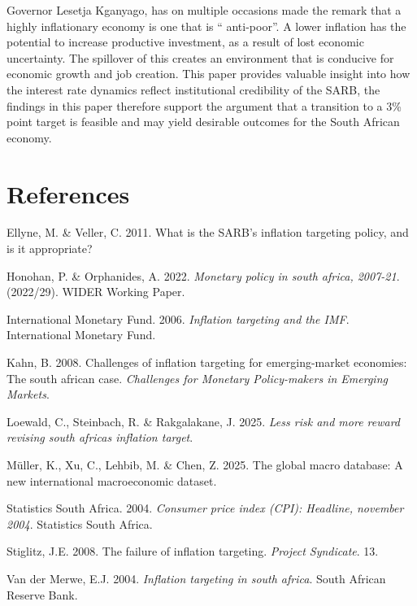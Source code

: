 \documentclass[11pt,preprint]{elsarticle}
\numberwithin{equation}{section}
\numberwithin{figure}{section}
\numberwithin{table}{section}
\newlength{\cslhangindent}
\newenvironment{CSLReferences}[2] %
{\begin{list}{}{%
	\setlength{\itemindent}{0pt}
	\setlength{\leftmargin}{0pt}
	\setlength{\parsep}{0pt}
	\ifodd #1
	\setlength{\leftmargin}{\cslhangindent}
	\setlength{\itemindent}{-1\cslhangindent}
	\fi
	\setlength{\itemsep}{#2\baselineskip}}}
{\end{list}}
\begin{document}
\newpage

Governor Lesetja Kganyago, has on multiple occasions made the remark
that a highly inflationary economy is one that is `` anti-poor''. A
lower inflation has the potential to increase productive investment, as
a result of lost economic uncertainty. The spillover of this creates an
environment that is conducive for economic growth and job creation. This
paper provides valuable insight into how the interest rate dynamics
reflect institutional credibility of the SARB, the findings in this
paper therefore support the argument that a transition to a 3\% point
target is feasible and may yield desirable outcomes for the South
African economy.

\newpage

\section*{References}\label{references}

\label{refs}
\begin{CSLReferences}{1}{1}
Ellyne, M. \& Veller, C. 2011. What is the SARB's inflation targeting
policy, and is it appropriate?

Honohan, P. \& Orphanides, A. 2022. \emph{Monetary policy in south
africa, 2007-21}. (2022/29). WIDER Working Paper.

International Monetary Fund. 2006. \emph{Inflation targeting and the
{IMF}}. International Monetary Fund.

Kahn, B. 2008. Challenges of inflation targeting for emerging-market
economies: The south african case. \emph{Challenges for Monetary
Policy-makers in Emerging Markets}.

Loewald, C., Steinbach, R. \& Rakgalakane, J. 2025. \emph{Less risk and
more reward revising south africas inflation target}.

Müller, K., Xu, C., Lehbib, M. \& Chen, Z. 2025. The global macro
database: A new international macroeconomic dataset.

Statistics South Africa. 2004. \emph{Consumer price index (CPI):
Headline, november 2004}. Statistics South Africa.

Stiglitz, J.E. 2008. The failure of inflation targeting. \emph{Project
Syndicate}. 13.

Van der Merwe, E.J. 2004. \emph{Inflation targeting in south africa}.
South African Reserve Bank.

\end{CSLReferences}
\end{document}
